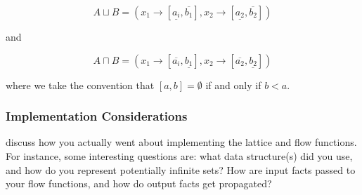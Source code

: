 \documentclass{article}
\theoremstyle{definition}
\begin{document}
\[ A \sqcup B = (x_1 \rightarrow [\underline{a_i}, \overline{b_1} ], x_2 \rightarrow [\underline{a_2}, \overline{b_2} ] )\]

and

\[ A \sqcap B = (x_1 \rightarrow [\overline{a_i}, \underline{b_1} ], x_2 \rightarrow [\overline{a_2}, \underline{b_2} ] )\]

where we take the convention that $[a, b] = \emptyset$ if and only if $b < a$.



\subsubsection{Implementation Considerations}
\begin{framed}
  discuss how you actually went about implementing the lattice and
  flow functions. For instance, some interesting questions are: what
  data structure(s) did you use, and how do you represent potentially
  infinite sets? How are input facts passed to your flow functions,
  and how do output facts get propagated?
\end{framed}
\end{document}
